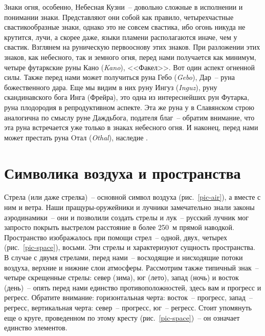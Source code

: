 \documentclass[pscyr,titlepage,chapters]{hedreport}
\begin{document}
  Знаки огня, особенно, Небесная Кузни~-- довольно сложные в исполнении и
  понимании знаки. Представляют они собой как правило, четырехчастные
  свастикообразные знаки, однако это не совсем свастика, ибо огонь никуда не
  крутится, лучи, а скорее даже, языки пламени располагаются иначе, чем у
  свастик. Взглянем на руническую первооснову этих знаков. При разложении этих
  знаков, как небесного, так и земного огня, перед нами получается как минимум,
  четыре футаркские руны Кано (\emph{Kano}), <<Факел>>. Вот один аспект огненной
  силы. Также перед нами может получиться
  руна Гебо (\emph{Gebo}), Дар~-- руна божественного дара. Еще мы видим в них
  руну Ингуз (\emph{Inguz}), руну скандинавского бога Инга (Фрейра), это одна из
  интереснейших рун Футарка, руна плодородия в репродуктивном аспекте. Эта же
  руна у в Славянском строю аналогична по смыслу руне Даждьбога, подателя
  благ~-- обратим внимание, что эта руна встречается уже только в знаках
  небесного огня. И наконец, перед нами может престать руна Oтал (\emph{Othal}),
  наследие \cite{4}.

  \chapter{Символика воздуха и пространства}

  Стрела (или даже стрелка)~-- основной символ
  воздуха (рис.~\ref{pic-air}), а вместе с ним и ветра. Наши пращуры-оружейники
  и лучники замечательно знали законы аэродинамики~-- они и позволили создать
  стрелы и  лук~-- русский лучник мог запросто покрыть выстрелом расстояние в 
  более 250~м прямой наводкой. Пространство изображалось при помощи стрел~--
  одной, двух, четырех (рис.~\ref{pic-space}), восьми. Эти стрелы и
  характеризуют сущность пространства. В случае с двумя стрелами, перед нами~--
  восходящие и нисходящие потоки воздуха, верхние и нижние слои атмосферы.
  Рассмотрим также типичный знак~-- четыре скрещенные стрелы: север (зима),
  юг (лето), запад (ночь) и восток (день)~-- опять перед нами единство
  противоположностей, здесь вам и прогресс и регресс. Обратите внимание:
  горизонтальная черта: восток~-- прогресс, запад~-- регресс, вертикальная
  черта: север~-- прогресс, юг~-- регресс. Стоит упомянуть еще о круге,
  проведенном по этому кресту (рис.~\ref{pic-space})~-- он означает единство
  элементов.
\end{document}
